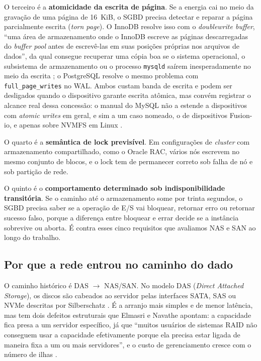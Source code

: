 \documentclass[11pt,a4paper]{article}
\begin{document}
O terceiro é a \textbf{atomicidade da escrita de página}. Se a energia cai no meio da gravação de
uma página de 16~KiB, o SGBD precisa detectar e reparar a página parcialmente escrita (\textit{torn
page}). O InnoDB resolve isso com o \textit{doublewrite buffer}, ``uma área de armazenamento onde o
InnoDB escreve as páginas descarregadas do \textit{buffer pool} antes de escrevê-las em suas posições
próprias nos arquivos de dados'', da qual consegue recuperar uma cópia boa se o sistema operacional,
o subsistema de armazenamento ou o processo \texttt{mysqld} saírem inesperadamente no meio da escrita
\cite{mysqldw}; o PostgreSQL resolve o mesmo problema com \texttt{full\_page\_writes} no WAL. Ambos
custam banda de escrita e podem ser desligados quando o dispositivo garante escrita atômica, mas
convém registrar o alcance real dessa concessão: o manual do MySQL não a estende a dispositivos com
\textit{atomic writes} em geral, e sim a um caso nomeado, o de dispositivos Fusion-io, e apenas sobre
NVMFS em Linux \cite{mysqldw}.

O quarto é a \textbf{semântica de lock previsível}. Em configurações de \textit{cluster} com
armazenamento compartilhado, como o Oracle RAC, vários nós escrevem no mesmo conjunto de blocos, e o
lock tem de permanecer correto sob falha de nó e sob partição de rede.

O quinto é o \textbf{comportamento determinado sob indisponibilidade transitória}. Se o caminho até o
armazenamento some por trinta segundos, o SGBD precisa saber se a operação de E/S vai bloquear,
retornar erro ou retornar sucesso falso, porque a diferença entre bloquear e errar decide se a
instância sobrevive ou aborta. É contra esses cinco requisitos que avaliamos NAS e SAN ao longo do
trabalho.

\subsection{Por que a rede entrou no caminho do dado}

O caminho histórico é DAS $\rightarrow$ NAS/SAN. No modelo DAS (\textit{Direct Attached Storage}), os
discos são cabeados ao servidor pelas interfaces SATA, SAS ou NVMe descritas por Silberschatz
\cite{silberschatz2020}. É a arranjo mais simples e de menor latência, mas tem dois defeitos
estruturais que Elmasri e Navathe apontam: a capacidade fica presa a um servidor específico, já que
``muitos usuários de sistemas RAID não conseguem usar a capacidade efetivamente porque ela precisa
estar ligada de maneira fixa a um ou mais servidores'', e o custo de gerenciamento cresce com o
número de ilhas \cite{elmasri2018}.
\end{document}
